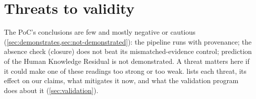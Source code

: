 \section{Threats to validity}\label{sec:threats}

The PoC's conclusions are few and mostly negative or cautious
(\cref{sec:demonstrates,sec:not-demonstrated}): the pipeline runs with provenance; the absence check
(closure) does not beat its mismatched-evidence control; prediction of the Human Knowledge Residual is not
demonstrated. A threat matters here if it could make one of these readings too strong or too weak.
 lists each threat, its effect on our claims, what mitigates it now, and what the
validation program does about it (\cref{sec:validation}).

